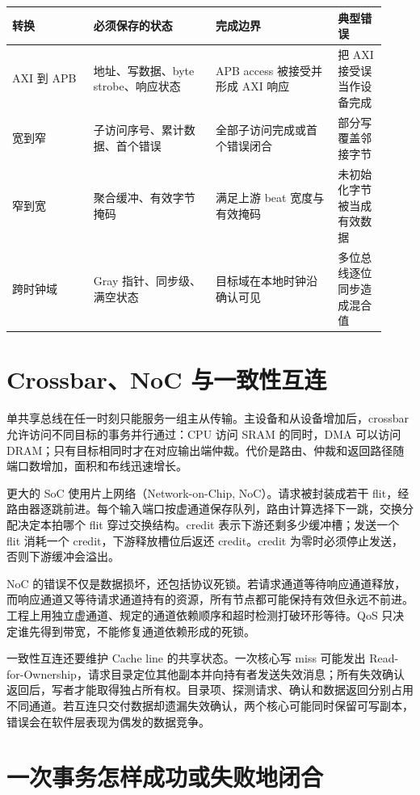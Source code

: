 \begin{longtable}{L{0.2\linewidth}L{0.30\linewidth}L{0.30\linewidth}L{0.12\linewidth}}
\toprule
转换 & 必须保存的状态 & 完成边界 & 典型错误 \\
\midrule
AXI 到 APB & 地址、写数据、byte strobe、响应状态 & APB access 被接受并形成 AXI 响应 & 把 AXI 接受误当作设备完成 \\
宽到窄 & 子访问序号、累计数据、首个错误 & 全部子访问完成或首个错误闭合 & 部分写覆盖邻接字节 \\
窄到宽 & 聚合缓冲、有效字节掩码 & 满足上游 beat 宽度与有效掩码 & 未初始化字节被当成有效数据 \\
跨时钟域 & Gray 指针、同步级、满空状态 & 目标域在本地时钟沿确认可见 & 多位总线逐位同步造成混合值 \\
\bottomrule
\end{longtable}

\section{Crossbar、NoC 与一致性互连}

单共享总线在任一时刻只能服务一组主从传输。主设备和从设备增加后，crossbar 允许访问不同目标的事务并行通过：CPU 访问 SRAM 的同时，DMA 可以访问 DRAM；只有目标相同时才在对应输出端仲裁。代价是路由、仲裁和返回路径随端口数增加，面积和布线迅速增长。

更大的 SoC 使用片上网络（Network-on-Chip, NoC）。请求被封装成若干 flit，经路由器逐跳前进。每个输入端口按虚通道保存队列，路由计算选择下一跳，交换分配决定本拍哪个 flit 穿过交换结构。credit 表示下游还剩多少缓冲槽；发送一个 flit 消耗一个 credit，下游释放槽位后返还 credit。credit 为零时必须停止发送，否则下游缓冲会溢出。

NoC 的错误不仅是数据损坏，还包括协议死锁。若请求通道等待响应通道释放，而响应通道又等待请求通道持有的资源，所有节点都可能保持有效但永远不前进。工程上用独立虚通道、规定的通道依赖顺序和超时检测打破环形等待。QoS 只决定谁先得到带宽，不能修复通道依赖形成的死锁。

一致性互连还要维护 Cache line 的共享状态。一次核心写 miss 可能发出 Read-for-Ownership，请求目录定位其他副本并向持有者发送失效消息；所有失效确认返回后，写者才能取得独占所有权。目录项、探测请求、确认和数据返回分别占用不同通道。若互连只交付数据却遗漏失效确认，两个核心可能同时保留可写副本，错误会在软件层表现为偶发的数据竞争。

\section{一次事务怎样成功或失败地闭合}

